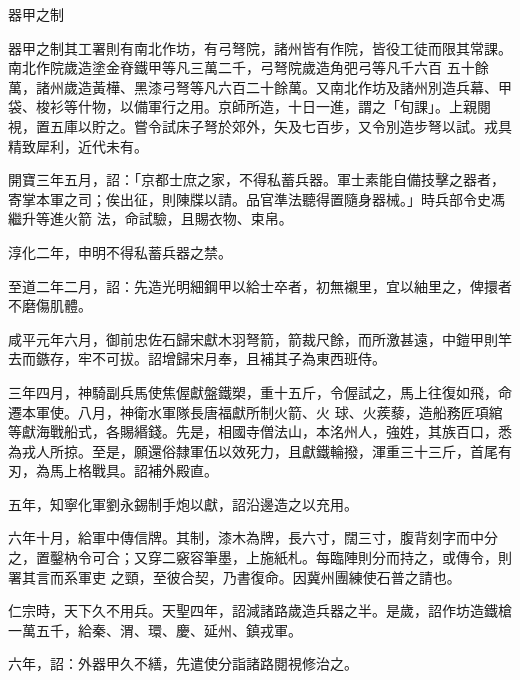 
\begin{pinyinscope}

 器甲之制



 器甲之制其工署則有南北作坊，有弓弩院，諸州皆有作院，皆役工徒而限其常課。南北作院歲造塗金脊鐵甲等凡三萬二千，弓弩院歲造角弝弓等凡千六百
 五十餘萬，諸州歲造黃樺、黑漆弓弩等凡六百二十餘萬。又南北作坊及諸州別造兵幕、甲袋、梭衫等什物，以備軍行之用。京師所造，十日一進，謂之「旬課」。上親閱視，置五庫以貯之。嘗令試床子弩於郊外，矢及七百步，又令別造步弩以試。戎具精致犀利，近代未有。



 開寶三年五月，詔：「京都士庶之家，不得私蓄兵器。軍士素能自備技擊之器者，寄掌本軍之司；俟出征，則陳牒以請。品官準法聽得置隨身器械。」時兵部令史馮繼升等進火箭
 法，命試驗，且賜衣物、束帛。



 淳化二年，申明不得私蓄兵器之禁。



 至道二年二月，詔：先造光明細鋼甲以給士卒者，初無襯里，宜以紬里之，俾擐者不磨傷肌體。



 咸平元年六月，御前忠佐石歸宋獻木羽弩箭，箭裁尺餘，而所激甚遠，中鎧甲則竿去而鏃存，牢不可拔。詔增歸宋月奉，且補其子為東西班侍。



 三年四月，神騎副兵馬使焦偓獻盤鐵槊，重十五斤，令偓試之，馬上往復如飛，命遷本軍使。八月，神衛水軍隊長唐福獻所制火箭、火
 球、火蒺藜，造船務匠項綰等獻海戰船式，各賜緡錢。先是，相國寺僧法山，本洺州人，強姓，其族百口，悉為戎人所掠。至是，願還俗隸軍伍以效死力，且獻鐵輪撥，渾重三十三斤，首尾有刃，為馬上格戰具。詔補外殿直。



 五年，知寧化軍劉永錫制手炮以獻，詔沿邊造之以充用。



 六年十月，給軍中傳信牌。其制，漆木為牌，長六寸，闊三寸，腹背刻字而中分之，置鑿枘令可合；又穿二竅容筆墨，上施紙札。每臨陣則分而持之，或傳令，則署其言而系軍吏
 之頸，至彼合契，乃書復命。因冀州團練使石普之請也。



 仁宗時，天下久不用兵。天聖四年，詔減諸路歲造兵器之半。是歲，詔作坊造鐵槍一萬五千，給秦、渭、環、慶、延州、鎮戎軍。



 六年，詔：外器甲久不繕，先遣使分詣諸路閱視修治之。




\end{pinyinscope}
